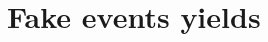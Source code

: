\clearpage

\section{Fake events yields}

\begin{table}[htb]
    \centering
    
    \label{appendix:fakes_numbers}
\end{table}

\clearpage